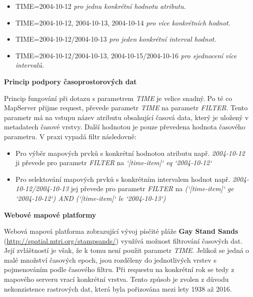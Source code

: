 \begin{itemize}
\item TIME=2004-10-12 \textit{pro jednu konkrétní hodnotu atributu.}
\item TIME=2004-10-12, 2004-10-13, 2004-10-14 \textit{pro více
    konkrétních hodnot.}
\item TIME=2004-10-12/2004-10-13 \textit{pro jeden konkrétní interval
    hodnot.}
\item TIME=2004-10-12/2004-10-13, 2004-10-15/2004-10-16 \textit{pro
    sjednocení více intervalů.}
\end{itemize}

\bigskip
\noindent
\textbf{Princip podpory časoprostorových dat}

Princip fungování při dotazu s parametrem \textit{TIME} je velice
snadný. Po té co MapServer přijme request, převede parametr
\textit{TIME} na parametr \textit{FILTER}. Tento parametr má na vstupu
název atributu obsahující časová data, který je uložený v metadatech
časové vrstvy\cite{mapserver_about}. Další hodnotou je pouze převedena
hodnota časového parametru. V praxi vypadá filtr následovně:

\bigskip
\begin{itemize}
	\item Pro výběr mapových prvků s konkrétní hodnotou
atributu např. \textit{2004-10-12} ji převede pro parametr
\textit{FILTER} na \textit{`[time-item]` eq `2004-10-12`}
	\item Pro selektování mapových prvků s konkrétním intervalem
hodnot např. \textit{2004-10-12/2004-10-13} jej převede pro parametr
\textit{FILTER} na \textit{(`[time-item]` ge `2004-10-12`) AND
(`[time-item]` le `2004-10-13`)}
\end{itemize}


\bigskip
\noindent \textbf{Webové mapové platformy}

Webová mapová platforma zobrazující vývoj písčité pláže \textbf{Gay
Stand Sands} (\url{http://spatial.mtri.org/stampsands/}) využívá možnost
filtrování časových dat. Její zvláštností je však, že k tomu není
použit parametr \textit{TIME}. Jelikož se jedná o malé množství
časových epoch, jsou rozděleny do jednotlivých vrstev s pojmenováním
podle časového filtru. Při requestu na konkrétní rok se tedy z
mapového serveru vrací konkrétní vrstva. Tento způsob je zvolen z
důvodu nekonzistence rastrových dat, která byla pořizována mezi lety
1938 až 2016.

